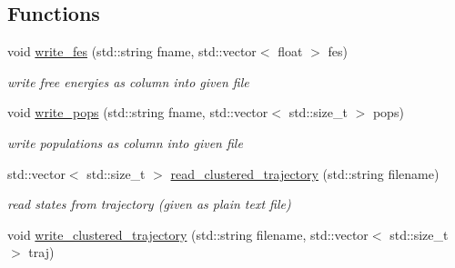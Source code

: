 \subsection*{Functions}
\begin{DoxyCompactItemize}
\item 
\hypertarget{namespaceClustering_1_1Tools_a36d73f165c56149e213b7a8dc0cfdc92}{void \hyperlink{namespaceClustering_1_1Tools_a36d73f165c56149e213b7a8dc0cfdc92}{write\-\_\-fes} (std\-::string fname, std\-::vector$<$ float $>$ fes)}\label{namespaceClustering_1_1Tools_a36d73f165c56149e213b7a8dc0cfdc92}

\begin{DoxyCompactList}\small\item\em write free energies as column into given file \end{DoxyCompactList}\item 
\hypertarget{namespaceClustering_1_1Tools_ad91d0bcee880f9cfcbcbab3fc6b0d941}{void \hyperlink{namespaceClustering_1_1Tools_ad91d0bcee880f9cfcbcbab3fc6b0d941}{write\-\_\-pops} (std\-::string fname, std\-::vector$<$ std\-::size\-\_\-t $>$ pops)}\label{namespaceClustering_1_1Tools_ad91d0bcee880f9cfcbcbab3fc6b0d941}

\begin{DoxyCompactList}\small\item\em write populations as column into given file \end{DoxyCompactList}\item 
\hypertarget{namespaceClustering_1_1Tools_a1b0d69e356c4f5f9d472e547942c692b}{std\-::vector$<$ std\-::size\-\_\-t $>$ \hyperlink{namespaceClustering_1_1Tools_a1b0d69e356c4f5f9d472e547942c692b}{read\-\_\-clustered\-\_\-trajectory} (std\-::string filename)}\label{namespaceClustering_1_1Tools_a1b0d69e356c4f5f9d472e547942c692b}

\begin{DoxyCompactList}\small\item\em read states from trajectory (given as plain text file) \end{DoxyCompactList}\item 
\hypertarget{namespaceClustering_1_1Tools_acb1963adb2a531851909575bb30926c1}{void \hyperlink{namespaceClustering_1_1Tools_acb1963adb2a531851909575bb30926c1}{write\-\_\-clustered\-\_\-trajectory} (std\-::string filename, std\-::vector$<$ std\-::size\-\_\-t $>$ traj)}\label{namespaceClustering_1_1Tools_acb1963adb2a531851909575bb30926c1}


\end{DoxyCompactItemize}
